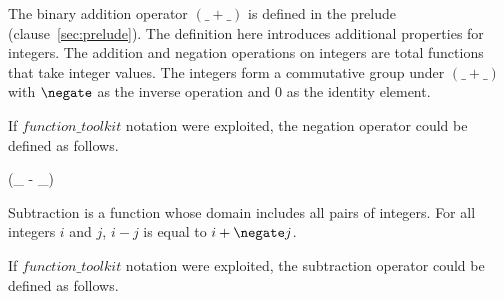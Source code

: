 \documentclass[draft,a4paper,10pt,wd]{isov2}
\begin{document}
The binary addition operator $(\_ + \_)$ is defined in the prelude
(clause~\ref{sec:prelude}).
The definition here introduces additional properties for integers.
The addition and negation operations on integers are total functions that
take integer values.
The integers form a commutative group under $(\_ + \_)$ with $\negate$ as
the inverse operation and $0$ as the identity element.
\begin{note}
If $function\_toolkit$ notation were exploited,
the negation operator could be defined as follows.
\end{note}


\begin{zed}
 \leftassoc (\_ - \_)
\end{zed}


Subtraction is a function whose domain includes all pairs of integers.
For all integers $i$ and $j$,
$i - j$ is equal to $i + \negate j$.
\begin{note}
If $function\_toolkit$ notation were exploited,
the subtraction operator could be defined as follows.
\end{note}
\end{document}
